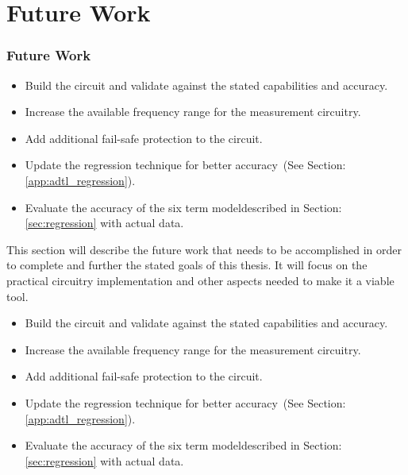 \section {Future Work}
\label{sec:futureWork}

\newcommand{\futWorkCmd}
{
\begin{itemize}
    \item Build the circuit and validate against the stated capabilities and accuracy.
    \item Increase the available frequency range for the measurement circuitry.
    \item Add additional fail-safe protection to the circuit.
    \item Update the regression technique for better accuracy\ifisPPT \else~(See Section: \ref{app:adtl_regression})\fi.
    \item Evaluate the accuracy of the six term model\ifisPPT \else described in Section: \ref{sec:regression} with actual data\fi.
\end{itemize}
}

\ifisPPT
\begin{frame}
    \frametitle{Future Work}
    \futWorkCmd
\end{frame}
\else
This section will describe the future work that needs to be accomplished in order to complete and further the stated goals of this thesis. It will focus on the practical circuitry implementation and other aspects needed to make it a viable tool.

\futWorkCmd
\fi

